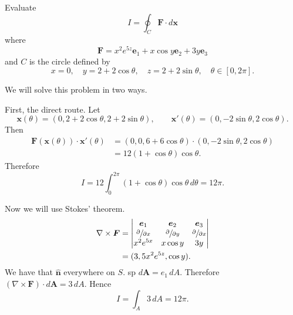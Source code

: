 
\begin{example}
    Evaluate
    \[
        I = \oint_C \bm F \cdot d\bm x
    \]
    where
    \[
        \bm F = x^2e^{5z} \bm e_1 + x \cos y \bm e_2 + 3y \bm e_3
    \]
    and $C$ is the circle defined by
    \[
        x = 0, 
        \quad y = 2 + 2\cos\theta, 
        \quad z = 2 + 2\sin\theta,
        \quad \theta \in [0,2\pi].
    \]
\end{example}

We will solve this problem in two ways.

\begin{solution}
    First, the direct route.
    Let 
    \[
        \bm x(\theta) = (0, 2 + 2\cos\theta, 2 + 2\sin\theta),
        \qquad \bm x'(\theta) = (0, -2\sin\theta, 2\cos\theta).
    \]
    Then
    \begin{align*}
        \bm F(\bm x(\theta)) \cdot \bm x'(\theta)
        &= (0, 0, 6+6\cos\theta) \cdot (0, -2\sin\theta, 2\cos\theta) \\
        &= 12(1 + \cos\theta)\cos\theta.
    \end{align*}
    Therefore
    \[
        I = 12 \int_0^{2\pi} (1+\cos\theta) \cos\theta \,d\theta = 12\pi.
    \]
\end{solution}

\begin{solution}
    Now we will use Stokes' theorem.
    \begin{align*}
        \nabla \times \bm F
        &=
        \begin{vmatrix}
            \bm e_1 & \bm e_2 & \bm e_3 \\
            \sfrac{\partial}{\partial x} & 
            \sfrac{\partial}{\partial y} & 
            \sfrac{\partial}{\partial x} \\
            x^2 e^{5x} & x\cos y & 3y \\
        \end{vmatrix}
        \\
        &= (3, 5x^2e^{5z}, \cos y).
    \end{align*}
    We have that $\bm{\hat n}$ everywhere on $S$. sp $d\bm A = e_1\,dA$.
    Therefore $(\nabla \times \bm F) \cdot d\bm A = 3\,dA$.
    Hence
    \[
        I = \int_A 3\,dA = 12\pi.
    \]
\end{solution}
